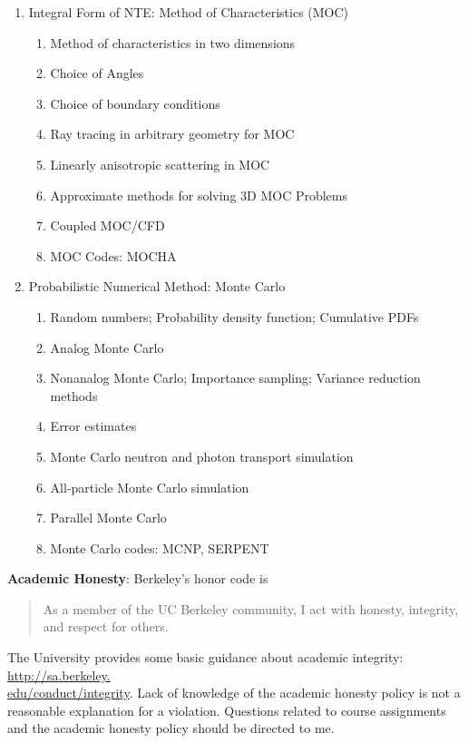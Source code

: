 \documentclass[12pt]{article}
\begin{document}
\begin{enumerate}
\item Integral Form of NTE: Method of Characteristics (MOC)
  \begin{enumerate}
  \item Method of characteristics in two dimensions
  \item Choice of Angles
  \item Choice of boundary conditions
  \item Ray tracing in arbitrary geometry for MOC
  \item Linearly anisotropic scattering in MOC
  \item Approximate methods for solving 3D MOC Problems
  \item Coupled MOC/CFD
  \item MOC Codes: MOCHA
  \end{enumerate}

\item Probabilistic Numerical Method: Monte Carlo
  \begin{enumerate}
  \item Random numbers; Probability density function; Cumulative PDFs
  \item Analog Monte Carlo
  \item Nonanalog Monte Carlo; Importance sampling; Variance reduction methods
  \item Error estimates
  \item Monte Carlo neutron and photon transport simulation
  \item All-particle Monte Carlo simulation
  \item Parallel Monte Carlo
  \item Monte Carlo codes: MCNP, SERPENT
  \end{enumerate}
\end{enumerate}

\vspace*{.15in}
\noindent\textbf{Academic Honesty}:  Berkeley's honor code is

\begin{quote}
As a member of the UC Berkeley community, I act with honesty, integrity, and respect for others.
\end{quote}

\noindent The University provides some basic guidance about academic integrity: \href{http://sa.berkeley.edu/conduct/integrity}{http://sa.berkeley.\\edu/conduct/integrity}. Lack of knowledge of the academic honesty policy is not a reasonable explanation for a violation. Questions related to course assignments and the academic honesty policy should be directed to me.
\end{document}
